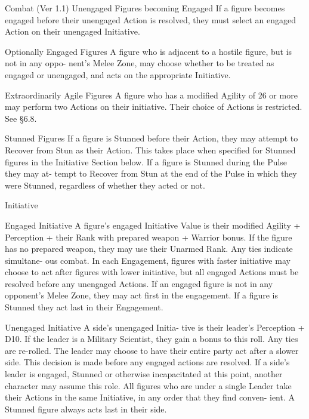 \begin{Chapter}{Combat (Ver 1.1)}
Unengaged  Figures  becoming  Engaged  If  a 
figure  becomes  engaged  before  their  unengaged 
Action  is  resolved,  they  must  select  an  engaged 
Action on their unengaged Initiative. 

Optionally  Engaged  Figures  A  figure  who  is 
adjacent to a hostile figure, but is not in any oppo-
nent’s  Melee  Zone,  may  choose  whether  to  be 
treated  as  engaged  or  unengaged,  and  acts  on  the 
appropriate Initiative. 

Extraordinarily Agile Figures A figure who has a 
modified  Agility  of  26  or  more  may  perform  two 
Actions on their initiative. Their choice of Actions 
is restricted. See §6.8. 

Stunned Figures If a figure is Stunned before their 
Action, they may attempt to Recover from Stun as 
their  Action.  This  takes  place  when  specified  for 
Stunned figures in the Initiative Section below. If a 
figure  is  Stunned  during  the  Pulse  they  may  at-
tempt to Recover from Stun at the end of the Pulse 
in which they were Stunned, regardless of whether 
they acted or not. 

Initiative 

Engaged  Initiative  A  figure’s  engaged  Initiative 
Value is their modified Agility + Perception + their 
Rank  with  prepared  weapon  +  Warrior  bonus.  If 
the  figure  has  no  prepared  weapon,  they  may  use 
their  Unarmed  Rank.  Any  ties  indicate  simultane-
ous  combat.  In  each  Engagement,  figures  with 
faster initiative may choose to act after figures with 
lower  initiative,  but  all  engaged  Actions  must  be 
resolved  before  any  unengaged  Actions.  If  an 
engaged  figure  is  not  in  any  opponent’s  Melee 
Zone,  they  may  act  first  in  the  engagement.  If  a 
figure is Stunned they act last in their Engagement. 

Unengaged  Initiative  A  side’s  unengaged  Initia-
tive is their leader’s Perception + D10. If the leader 
is  a  Military  Scientist,  they  gain  a  bonus  to  this 
roll. Any ties are re-rolled. The leader may choose 
to  have  their  entire  party  act  after  a  slower  side. 
This  decision  is  made  before  any  engaged  actions 
are resolved. If a side’s leader is engaged, Stunned 
or  otherwise  incapacitated  at  this  point,  another 
character may assume this role. All figures who are 
under  a  single  Leader  take  their  Actions  in  the 
same Initiative, in any order that they find conven-
ient. A Stunned figure always acts last in their side. 


\end{Chapter}
